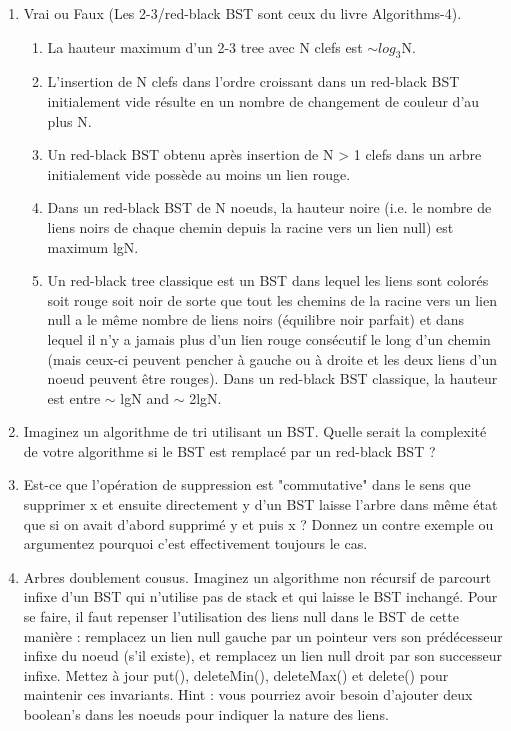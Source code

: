 \documentclass[11pt]{article}
\begin{document}
\begin{enumerate}
\begin{enumerate}
{\color{dkgreen}  }
\end{enumerate}

\item Vrai ou Faux (Les 2-3/red-black BST sont ceux du livre Algorithms-4).
\begin{enumerate}
\item La hauteur maximum d'un 2-3 tree avec N clefs est $\sim log_3$N.\\

{\color{dkgreen}  }

\item L'insertion de N clefs dans l'ordre croissant dans un red-black BST initialement
vide résulte en un nombre de changement de couleur d'au plus N.\\

\item Un red-black BST obtenu après insertion de N > 1 clefs dans un arbre initialement
vide possède au moins un lien rouge.\\

\item Dans un red-black BST de N noeuds, la hauteur noire (i.e. le nombre de liens
noirs de chaque chemin depuis la racine vers un lien null) est maximum lgN.\\

\item Un red-black tree classique est un BST dans lequel les liens sont colorés soit
rouge soit noir de sorte que tout les chemins de la racine vers un lien null a
le même nombre de liens noirs (équilibre noir parfait) et dans lequel il n'y
a jamais plus d'un lien rouge consécutif le long d'un chemin (mais ceux-ci
peuvent pencher à gauche ou à droite et les deux liens d'un noeud peuvent
être rouges). Dans un red-black BST classique, la hauteur est entre $\sim$ lgN
and $\sim$ 2lgN.
\end{enumerate}
\item Imaginez un algorithme de tri utilisant un BST. Quelle serait la complexité de
votre algorithme si le BST est remplacé par un red-black BST ?
\item Est-ce que l’opération de suppression est "commutative" dans le sens que supprimer
x et ensuite directement y d’un BST laisse l’arbre dans même état que si on
avait d’abord supprimé y et puis x ? Donnez un contre exemple ou argumentez
pourquoi c’est effectivement toujours le cas.
\item Arbres doublement cousus. Imaginez un algorithme non récursif de parcourt infixe
d’un BST qui n’utilise pas de stack et qui laisse le BST inchangé. Pour se faire, il
faut repenser l’utilisation des liens null dans le BST de cette manière : remplacez
un lien null gauche par un pointeur vers son prédécesseur infixe du noeud
(s’il existe), et remplacez un lien null droit par son successeur infixe. Mettez
à jour put(), deleteMin(), deleteMax() et delete() pour maintenir
ces invariants. Hint : vous pourriez avoir besoin d’ajouter deux boolean’s dans
les noeuds pour indiquer la nature des liens.
\end{enumerate}
\end{document}
